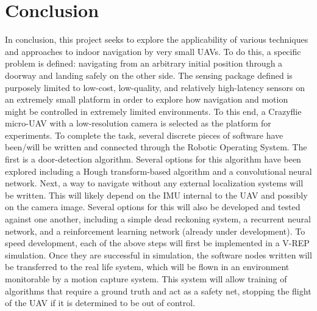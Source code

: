 \documentclass[12pt]{article}
\begin{document}
\section{Conclusion}
In conclusion, this project seeks to explore the applicability of various techniques and approaches to indoor navigation by very small UAVs. To do this, a specific problem is defined: navigating from an arbitrary initial position through a doorway and landing safely on the other side. The sensing package defined is purposely limited to low-cost, low-quality, and relatively high-latency sensors on an extremely small platform in order to explore how navigation and motion might be controlled in extremely limited environments. To this end, a Crazyflie micro-UAV with a low-resolution camera is selected as the platform for experiments. To complete the task, several discrete pieces of software have been/will be written and connected through the Robotic Operating System. The first is a door-detection algorithm. Several options for this algorithm have been explored including a Hough transform-based algorithm and a convolutional neural network. Next, a way to navigate without any external localization systems will be written. This will likely depend on the IMU internal to the UAV and possibly on the camera image. Several options for this will also be developed and tested against one another, including a simple dead reckoning system, a recurrent neural network, and a reinforcement learning network (already under development). To speed development, each of the above steps will first be implemented in a V-REP simulation. Once they are successful in simulation, the software nodes written will be transferred to the real life system, which will be flown in an environment monitorable by a motion capture system. This system will allow training of algorithms that require a ground truth and act as a safety net, stopping the flight of the UAV if it is determined to be out of control.





\end{document}
